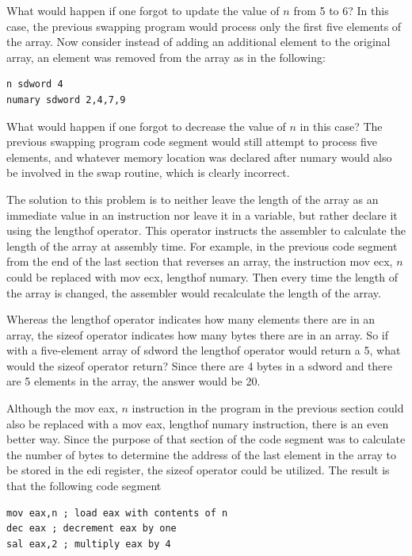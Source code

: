 \documentclass[10pt]{book}
\begin{document}
What would happen if one forgot to update the value of $n$ from 5 to 6? In this case, the previous swapping program would process only the first five elements of the array. Now consider instead of adding an additional element to the original array, an element was removed from the array as in the following:

\begin{verbatim}
n sdword 4
numary sdword 2,4,7,9
\end{verbatim}

What would happen if one forgot to decrease the value of $n$ in this case? The previous swapping program code segment would still attempt to process five elements, and whatever memory location was declared after numary would also be involved in the swap routine, which is clearly incorrect.

The solution to this problem is to neither leave the length of the array as an immediate value in an instruction nor leave it in a variable, but rather declare it using the lengthof operator. This operator instructs the assembler to calculate the length of the array at assembly time. For example, in the previous code segment from the end of the last section that reverses an array, the instruction mov ecx, $n$ could be replaced with mov ecx, lengthof numary. Then every time the length of the array is changed, the assembler would recalculate the length of the array.

Whereas the lengthof operator indicates how many elements there are in an array, the sizeof operator indicates how many bytes there are in an array. So if with a five-element array of sdword the lengthof operator would return a 5, what would the sizeof operator return? Since there are 4 bytes in a sdword and there are 5 elements in the array, the answer would be 20.

Although the mov eax, $n$ instruction in the program in the previous section could also be replaced with a mov eax, lengthof numary instruction, there is an even better way. Since the purpose of that section of the code segment was to calculate the number of bytes to determine the address of the last element in the array to be stored in the edi register, the sizeof operator could be utilized. The result is that the following code segment

\begin{verbatim}
mov eax,n ; load eax with contents of n
dec eax ; decrement eax by one
sal eax,2 ; multiply eax by 4
\end{verbatim}
\end{document}
